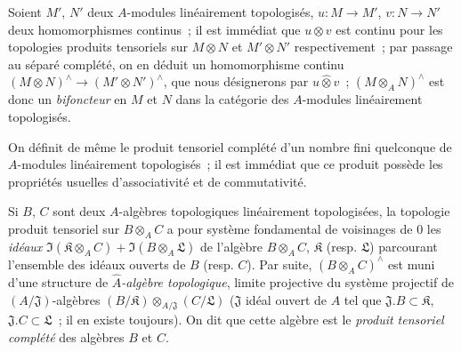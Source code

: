 \begin{env}[7.7.3]
\label{0.7.7.3-fr}
Soient $M'$, $N'$ deux $A$-modules linéairement topologisés,
$u:M\to M'$, $v:N\to N'$ deux homomorphismes continus~; il est immédiat
que $u\otimes v$ est continu pour les topologies produits tensoriels sur
$M\otimes N$ et $M'\otimes N'$ respectivement~; par passage au séparé
complété, on en déduit un homomorphisme continu
$(M\otimes N)^\wedge\to(M'\otimes N')^\wedge$, que nous désignerons
par $u\widehat\otimes v$~; $(M\otimes_A N)^\wedge$ est donc un
\emph{bifoncteur} en $M$ et $N$ dans la catégorie des $A$-modules
linéairement topologisés.
\end{env}

\begin{env}[7.7.4]
\label{0.7.7.4-fr}
On définit de même le produit tensoriel complété d'un nombre fini quelconque
de $A$-modules linéairement topologisés~; il est immédiat que ce produit
possède les propriétés usuelles d'associativité et de commutativité.
\end{env}

\begin{env}[7.7.5]
\label{0.7.7.5-fr}
Si $B$, $C$ sont deux $A$-algèbres topologiques linéairement topologisées,
la topologie produit tensoriel sur $B\otimes_A C$ a pour système fondamental
de voisinages de $0$ les \emph{idéaux}
$\Im(\mathfrak K\otimes_A C)+\Im(B\otimes_A\mathfrak L)$ de l'algèbre
$B\otimes_A C$, $\mathfrak K$ (resp. $\mathfrak L$) parcourant l'ensemble
des idéaux ouverts de $B$ (resp. $C$). Par suite, $(B\otimes_A C)^\wedge$
est muni d'une structure de \emph{$\widehat A$-algèbre topologique}, limite
projective du système projectif de $(A/\mathfrak J)$-algèbres
$(B/\mathfrak K)\otimes_{A/\mathfrak J}(C/\mathfrak L)$ ($\mathfrak J$
idéal ouvert de $A$ tel que $\mathfrak J.B\subset\mathfrak K$,
$\mathfrak J.C\subset\mathfrak L$~; il en existe toujours). On dit que
cette algèbre est le \emph{produit tensoriel complété} des algèbres $B$ et
$C$.
\end{env}

